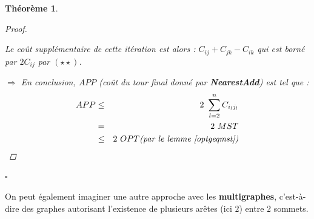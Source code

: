 \documentclass[12pt]{article}
\newcommand{\cqfd}{\begin{flushright}$\square$\end{flushright}}
\newtheorem{thm}{Th\'eor\`eme}[section]
\newtheorem{proof}{Preuve}[section]
\begin{document}
\begin{thm}
\begin{proof}
\begin{itemize}
Le coût supplémentaire de cette itération est alors : $C_{ij}+C_{jk}-C_{ik}$ qui est borné par $2C_{ij}$ par $(\star\star )$. \\
\end{itemize}

\noindent $\Rightarrow$ En conclusion, $APP$ (coût du tour final donné par \textbf{NearestAdd}) est tel que :
\begin{eqnarray}
\nonumber APP &\leq& 2\ \sum_{l=2}^n C_{i_lj_l} \\
\nonumber     & =  & 2\ MST \\
\nonumber     & \leq & 2\ OPT \text{\textit{(par le lemme \ref{optgeqmst})}}
\end{eqnarray}
\end{proof}
\cqfd
\end{thm}

On peut également imaginer une autre approche avec les \textbf{multigraphes}, c'est-à-dire des graphes autorisant l'existence de plusieurs
arêtes (ici $2$) entre $2$ sommets.
\end{document}
